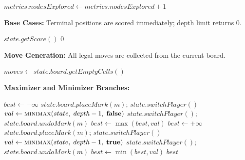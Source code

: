 \documentclass[conference]{IEEEtran}
\begin{document}
\begin{algorithm}[htbp]
\caption{Node Counter}
\begin{algorithmic}[1]
\State $metrics.nodesExplored \gets metrics.nodesExplored + 1$
\end{algorithmic}
\end{algorithm}

\textbf{Base Cases:}
Terminal positions are scored immediately; depth limit returns $0$.

\begin{algorithm}[htbp]
\caption{Base Cases}
\begin{algorithmic}[1]
    \State \Return $state.getScore()$
\EndIf
{}
    \State \Return $0$
\EndIf
\end{algorithmic}
\end{algorithm}

\textbf{Move Generation:}
All legal moves are collected from the current board.

\begin{algorithm}[htbp]
\caption{Move Generation}
\begin{algorithmic}[1]
\State $moves \gets state.board.getEmptyCells()$
\State {}
\end{algorithmic}
\end{algorithm}

\textbf{Maximizer and Minimizer Branches:}

\begin{algorithm}[htbp]
\caption{Maximizer and Minimizer Branches}
\begin{algorithmic}[1]
    \State $best \gets -\infty$
        \State $state.board.placeMark(m)$; \quad $state.switchPlayer()$
        \State $val \gets \Call{minimax}{state,\; depth-1,\; \textbf{false}}$
        \State $state.switchPlayer()$; \quad $state.board.undoMark(m)$
        \State $best \gets \max(best, val)$
    \EndFor
\Else
    \State $best \gets +\infty$
        \State $state.board.placeMark(m)$; \quad $state.switchPlayer()$
        \State $val \gets \Call{minimax}{state,\; depth-1,\; \textbf{true}}$
        \State $state.switchPlayer()$; \quad $state.board.undoMark(m)$
        \State $best \gets \min(best, val)$
    \EndFor
\EndIf
\State \Return $best$
\end{algorithmic}
\end{algorithm}
\end{document}
